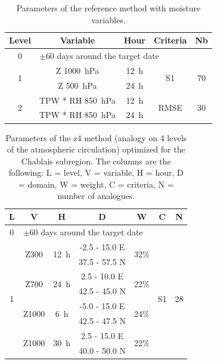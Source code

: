 \documentclass{ametsoc}
\begin{document}
\begin{table}[htbp]
	\footnotesize
	\caption{Parameters of the reference method with moisture variables.}
	\begin{center}
		\begin{tabular}{ccccc}
			\hline \textbf{Level} & \textbf{Variable} & \textbf{Hour} & \textbf{Criteria} & \textbf{Nb} \\ 
			\hline 
			0 & \multicolumn{4}{l}{$\pm 60$ days around the target date} \\
			\hline 
			\multirow{2}{*}{1} & Z 1000~hPa & 12~h & \multirow{2}{*}{S1} & \multirow{2}{*}{70} \\
			& Z 500~hPa & 24~h & & \\ 
			\hline
			\multirow{2}{*}{2} & TPW * RH 850~hPa & 12~h & \multirow{2}{*}{RMSE} & \multirow{2}{*}{30} \\
			& TPW * RH 850~hPa & 24~h & & \\ 
			\hline 
		\end{tabular} 
	\end{center}
	\label{table:params_R2}
\end{table}

\begin{table}[htbp]
	\footnotesize
	\caption{Parameters of the z4 method (analogy on 4 levels of the atmospheric circulation) optimized for the Chablais subregion. The columns are the following: L = level, V = variable, H = hour, D = domain, W = weight, C = criteria, N = number of analogues.}
	\begin{center}
		\begin{tabular}{ccccccc}
			\hline \textbf{L} & \textbf{V} & \textbf{H} & \textbf{D} & \textbf{W} & \textbf{C} & \textbf{N} \\ 
			\hline 
			0 & \multicolumn{6}{l}{$\pm 60$ days around the target date} \\
			\hline 
			\multirow{8}{*}{1} &  \multirow{2}{*}{Z300} & \multirow{2}{*}{12~h} & -2.5 - 15.0 \degree E & \multirow{2}{*}{32\%} & \multirow{8}{*}{S1} & \multirow{8}{*}{28} \\
			& & & 37.5 - 57.5 \degree N & & & \\ 
			& \multirow{2}{*}{Z700} & \multirow{2}{*}{24~h} & 2.5 - 10.0 \degree E & \multirow{2}{*}{22\%} & & \\ 
			& & & 42.5 - 45.0 \degree N & & & \\ 
			& \multirow{2}{*}{Z1000} & \multirow{2}{*}{6~h} & -5.0 - 15.0 \degree E & \multirow{2}{*}{24\%} & & \\ 
			& & & 42.5 - 47.5 \degree N & & & \\ 
			& \multirow{2}{*}{Z1000} & \multirow{2}{*}{30~h} & 2.5 - 15.0 \degree E & \multirow{2}{*}{22\%} & & \\ 
			& & & 40.0 - 50.0 \degree N & & & \\ 
			\hline 
		\end{tabular} 
	\end{center}
	\label{table:params_GA_z4}
\end{table}
\end{document}
